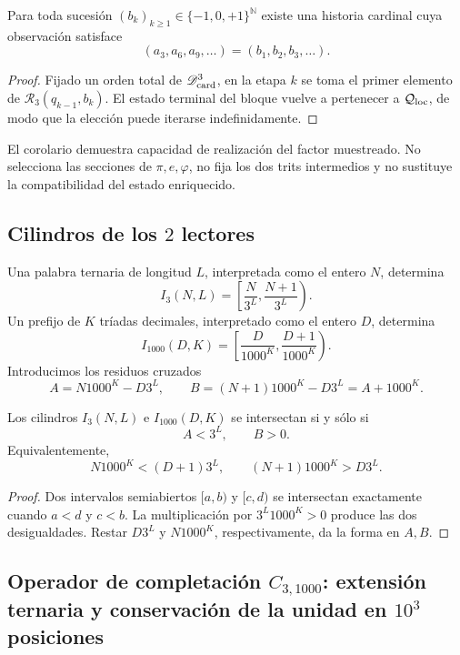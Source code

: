 {\begin{corollary}
\label{p12-83-c1-s8:cor:u006a-realizacion-sucesion}
Para toda sucesión
\((b_k)_{k\geq1}\in\{-1,0,+1\}^{\mathbb N}\) existe una historia cardinal
cuya observación satisface
\[
 (a_3,a_6,a_9,\ldots)=(b_1,b_2,b_3,\ldots).
\]
\end{corollary}

\begin{proof}
Fijado un orden total de \(\mathscr D_{\rm card}^3\), en la etapa \(k\) se
toma el primer elemento de \(\mathcal R_3(q_{k-1},b_k)\). El estado terminal
del bloque vuelve a pertenecer a \(\mathcal Q_{\rm loc}\), de modo que la
elección puede iterarse indefinidamente.
\end{proof}

El corolario demuestra capacidad de realización del factor muestreado. No
selecciona las secciones de \(\pi,e,\varphi\), no fija los dos trits
intermedios y no sustituye la compatibilidad del estado enriquecido.

\subsection{Cilindros de los \(2\) lectores}

Una palabra ternaria de longitud \(L\), interpretada como el entero \(N\),
determina
\[
 I_3(N,L)=\left[\frac{N}{3^L},\frac{N+1}{3^L}\right).
\]
Un prefijo de \(K\) tríadas decimales, interpretado como el entero \(D\),
determina
\[
 I_{1000}(D,K)=
 \left[\frac{D}{1000^K},\frac{D+1}{1000^K}\right).
\]
Introducimos los residuos cruzados
\[
 A=N1000^K-D3^L,
 \qquad
 B=(N+1)1000^K-D3^L=A+1000^K.
\]

\begin{lemma}
\label{p12-83-c1-s8:lem:u006a-criterio-entero}
Los cilindros \(I_3(N,L)\) e \(I_{1000}(D,K)\) se intersectan si y sólo si
\[
 \boxed{A<3^L,\qquad B>0.}
\]
Equivalentemente,
\[
 N1000^K<(D+1)3^L,
 \qquad
 (N+1)1000^K>D3^L.
\]
\end{lemma}

\begin{proof}
Dos intervalos semiabiertos \([a,b)\) y \([c,d)\) se intersectan
exactamente cuando \(a<d\) y \(c<b\). La multiplicación por
\(3^L1000^K>0\) produce las dos desigualdades. Restar \(D3^L\) y
\(N1000^K\), respectivamente, da la forma en \(A,B\).
\end{proof}

\subsection{Operador de completación \(C_{3,1000}\): extensión ternaria y conservación de la unidad en \(10^3\) posiciones}

}

